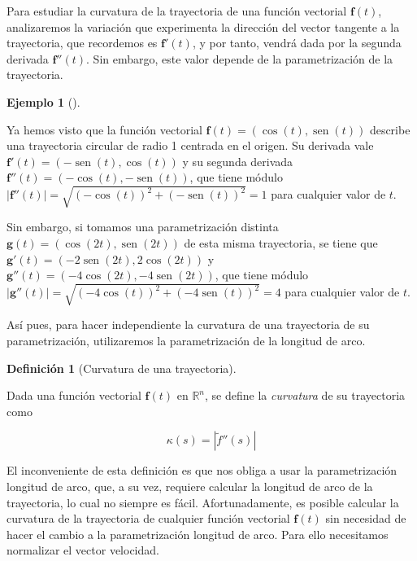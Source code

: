 \documentclass[
  a4paper,
]{scrreport}
\theoremstyle{definition}
\newtheorem{example}{Ejemplo}[chapter]
\theoremstyle{plain}
\theoremstyle{definition}
\newtheorem{definition}{Definición}[chapter]
\theoremstyle{definition}
\theoremstyle{plain}
\theoremstyle{plain}
\theoremstyle{remark}
\begin{document}
Para estudiar la curvatura de la trayectoria de una función vectorial
\(\mathbf{f}(t)\), analizaremos la variación que experimenta la
dirección del vector tangente a la trayectoria, que recordemos es
\(\mathbf{f}'(t)\), y por tanto, vendrá dada por la segunda derivada
\(\mathbf{f}''(t)\). Sin embargo, este valor depende de la
parametrización de la trayectoria.

\begin{example}[]\protect\hypertarget{exm-curvatura-dependiente-parametrizacion}{}\label{exm-curvatura-dependiente-parametrizacion}

Ya hemos visto que la función vectorial
\(\mathbf{f}(t)=(\cos(t),\operatorname{sen}(t))\) describe una
trayectoria circular de radio 1 centrada en el origen. Su derivada vale
\(\mathbf{f}'(t)=(-\operatorname{sen}(t),\cos(t))\) y su segunda
derivada \(\mathbf{f}''(t)=(-\cos(t),-\operatorname{sen}(t))\), que
tiene módulo
\(|\mathbf{f}''(t)| = \sqrt{(-\cos(t))^2+(-\operatorname{sen}(t))^2} = 1\)
para cualquier valor de \(t\).

Sin embargo, si tomamos una parametrización distinta
\(\mathbf{g}(t)=(\cos(2t), \operatorname{sen}(2t))\) de esta misma
trayectoria, se tiene que
\(\mathbf{g}'(t)=(-2\operatorname{sen}(2t),2\cos(2t))\) y
\(\mathbf{g}''(t)=(-4\cos(2t), -4\operatorname{sen}(2t))\), que tiene
módulo
\(|\mathbf{g}''(t)| = \sqrt{(-4\cos(t))^2+(-4\operatorname{sen}(t))^2} = 4\)
para cualquier valor de \(t\).

\end{example}

Así pues, para hacer independiente la curvatura de una trayectoria de su
parametrización, utilizaremos la parametrización de la longitud de arco.

\begin{definition}[Curvatura de una
trayectoria]\protect\hypertarget{def-curvatura-trayectoria}{}\label{def-curvatura-trayectoria}

Dada una función vectorial \(\mathbf{f}(t)\) en \(\mathbb{R}^n\), se
define la \emph{curvatura} de su trayectoria como

\[
\kappa(s) = |\tilde{f}''(s)|
\]

\end{definition}

El inconveniente de esta definición es que nos obliga a usar la
parametrización longitud de arco, que, a su vez, requiere calcular la
longitud de arco de la trayectoria, lo cual no siempre es fácil.
Afortunadamente, es posible calcular la curvatura de la trayectoria de
cualquier función vectorial \(\mathbf{f}(t)\) sin necesidad de hacer el
cambio a la parametrización longitud de arco. Para ello necesitamos
normalizar el vector velocidad.
\end{document}
